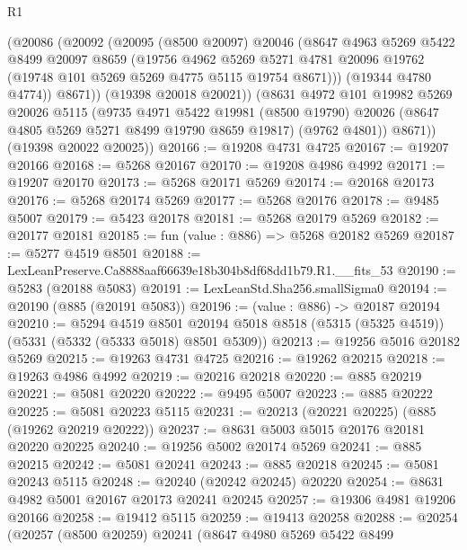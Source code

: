 \begin{lexlean}{R1}
\begin{coremodule}
          (@20086
            (@20092
              (@20095
                (@8500 @20097)
                @20046
                (@8647
                  @4963
                  @5269
                  @5422
                  @8499
                  @20097
                  @8659
                  (@19756
                    @4962
                    @5269
                    @5271
                    @4781
                    @20096
                    @19762
                    (@19748 @101 @5269 @5269 @4775 @5115 @19754 @8671)))
                (@19344 @4780 @4774))
              @8671))
          (@19398 @20018 @20021))
        (@8631
          @4972
          @101
          @19982
          @5269
          @20026
          @5115
          (@9735
            @4971
            @5422
            @19981
            (@8500 @19790)
            @20026
            (@8647 @4805 @5269 @5271 @8499 @19790 @8659 @19817)
            (@9762 @4801))
          @8671))
      (@19398 @20022 @20025))
@20166 := @19208 @4731 @4725
@20167 := @19207 @20166
@20168 := @5268 @20167
@20170 := @19208 @4986 @4992
@20171 := @19207 @20170
@20173 := @5268 @20171 @5269
@20174 := @20168 @20173
@20176 := @5268 @20174 @5269
@20177 := @5268 @20176
@20178 := @9485 @5007
@20179 := @5423 @20178
@20181 := @5268 @20179 @5269
@20182 := @20177 @20181
@20185 := fun (value : @886) => @5268 @20182 @5269
@20187 := @5277 @4519 @8501
@20188 := LexLeanPreserve.Ca8888aaf66639e18b304b8df68dd1b79.R1.__fits_53
@20190 := @5283 (@20188 @5083)
@20191 := LexLeanStd.Sha256.smallSigma0
@20194 := @20190 (@885 (@20191 @5083))
@20196 := (value : @886) -> @20187 @20194
@20210 := @5294
    @4519
    @8501
    @20194
    @5018
    @8518
    (@5315 (@5325 @4519))
    (@5331 (@5332 (@5333 @5018) @8501 @5309))
@20213 := @19256 @5016 @20182 @5269
@20215 := @19263 @4731 @4725
@20216 := @19262 @20215
@20218 := @19263 @4986 @4992
@20219 := @20216 @20218
@20220 := @885 @20219
@20221 := @5081 @20220
@20222 := @9495 @5007
@20223 := @885 @20222
@20225 := @5081 @20223 @5115
@20231 := @20213 (@20221 @20225) (@885 (@19262 @20219 @20222))
@20237 := @8631 @5003 @5015 @20176 @20181 @20220 @20225
@20240 := @19256 @5002 @20174 @5269
@20241 := @885 @20215
@20242 := @5081 @20241
@20243 := @885 @20218
@20245 := @5081 @20243 @5115
@20248 := @20240 (@20242 @20245) @20220
@20254 := @8631 @4982 @5001 @20167 @20173 @20241 @20245
@20257 := @19306 @4981 @19206 @20166
@20258 := @19412 @5115
@20259 := @19413 @20258
@20288 := @20254
    (@20257
      (@8500 @20259)
      @20241
      (@8647
        @4980
        @5269
        @5422
        @8499

\end{coremodule}
\end{lexlean}
